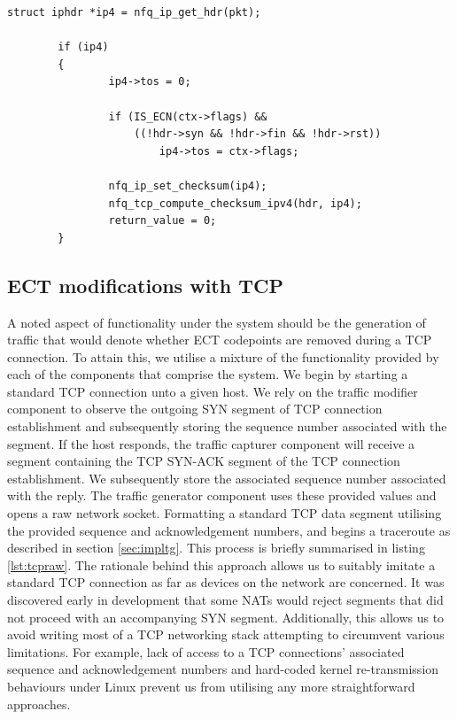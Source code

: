 \documentclass{l4proj}
\begin{document}
\begin{lstlisting}[caption={A demonstration of userspace modification of the traffic class byte on packets queued by the operating system kernel for transmission on the network.}]
struct iphdr *ip4 = nfq_ip_get_hdr(pkt);

        if (ip4)
        {
                ip4->tos = 0;

                if (IS_ECN(ctx->flags) && 
                    ((!hdr->syn && !hdr->fin && !hdr->rst))
                        ip4->tos = ctx->flags;

                nfq_ip_set_checksum(ip4);
                nfq_tcp_compute_checksum_ipv4(hdr, ip4);
                return_value = 0;
        }
\end{lstlisting}
\label{lst:libnf}


\subsection{ECT modifications with TCP}
\label{sec:tcponpath}


A noted aspect of functionality under the system should be the generation of traffic that would denote whether ECT codepoints are removed during a TCP connection. To attain this, we utilise a mixture of the functionality provided by each of the components that comprise the system. We begin by starting a standard TCP connection unto a given host. We rely on the traffic modifier component to observe the outgoing SYN segment of TCP connection establishment and subsequently storing the sequence number associated with the segment. If the host responds, the traffic capturer component will receive a segment containing the TCP SYN-ACK segment of the TCP connection establishment. We subsequently store the associated sequence number associated with the reply. The traffic generator component uses these provided values and opens a raw network socket. Formatting a standard TCP data segment utilising the provided sequence and acknowledgement numbers, and begins a traceroute as described in section \ref{sec:impltg}. This process is briefly summarised in listing \ref{lst:tcpraw}. The rationale behind this approach allows us to suitably imitate a standard TCP connection as far as devices on the network are concerned. It was discovered early in development that some NATs would reject segments that did not proceed with an accompanying SYN segment. Additionally, this allows us to avoid writing most of a TCP networking stack attempting to circumvent various limitations. For example, lack of access to a TCP connections' associated sequence and acknowledgement numbers and hard-coded kernel re-transmission behaviours under Linux prevent us from utilising any more straightforward approaches.
\end{document}
